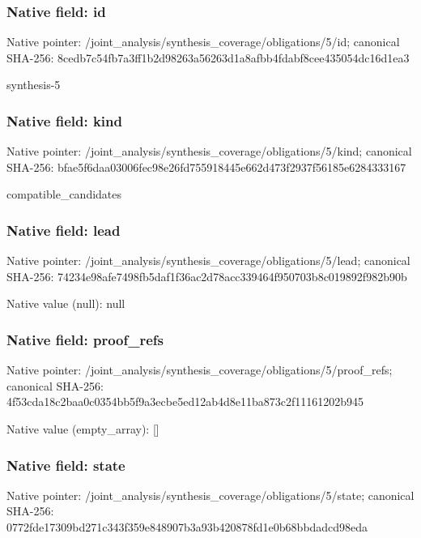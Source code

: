 \documentclass[10pt,a4paper]{article}
\begin{document}
\subsubsection{Native field: id}
Native pointer: /joint\_\allowbreak{}analysis/synthesis\_\allowbreak{}coverage/obligations/5/id; canonical SHA-256: 8cedb7c54fb7a3ff1b2d98263a56263d1a8afbb4fdabf8cee435054dc16d1ea3

\begingroup\raggedright\sloppy synthesis-5\par\endgroup

\subsubsection{Native field: kind}
Native pointer: /joint\_\allowbreak{}analysis/synthesis\_\allowbreak{}coverage/obligations/5/kind; canonical SHA-256: bfae5f6daa03006fec98e26fd755918445e662d473f2937f56185e6284333167

\begingroup\raggedright\sloppy compatible\_\allowbreak{}candidates\par\endgroup

\subsubsection{Native field: lead}
Native pointer: /joint\_\allowbreak{}analysis/synthesis\_\allowbreak{}coverage/obligations/5/lead; canonical SHA-256: 74234e98afe7498fb5daf1f36ac2d78acc339464f950703b8c019892f982b90b

Native value (null): null

\subsubsection{Native field: proof\_\allowbreak{}refs}
Native pointer: /joint\_\allowbreak{}analysis/synthesis\_\allowbreak{}coverage/obligations/5/proof\_\allowbreak{}refs; canonical SHA-256: 4f53cda18c2baa0c0354bb5f9a3ecbe5ed12ab4d8e11ba873c2f11161202b945

Native value (empty\_\allowbreak{}array): []

\subsubsection{Native field: state}
Native pointer: /joint\_\allowbreak{}analysis/synthesis\_\allowbreak{}coverage/obligations/5/state; canonical SHA-256: 0772fde17309bd271c343f359e848907b3a93b420878fd1e0b68bbdadcd98eda
\end{document}
